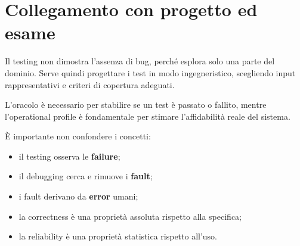 \section{Collegamento con progetto ed esame}

Il testing non dimostra l'assenza di bug, perché esplora solo una parte del dominio. Serve quindi progettare i test in modo ingegneristico, scegliendo input rappresentativi e criteri di copertura adeguati.

L'oracolo è necessario per stabilire se un test è passato o fallito, mentre l'operational profile è fondamentale per stimare l'affidabilità reale del sistema.

È importante non confondere i concetti:

\begin{itemize}
    \item il testing osserva le \textbf{failure};
    \item il debugging cerca e rimuove i \textbf{fault};
    \item i fault derivano da \textbf{error} umani;
    \item la correctness è una proprietà assoluta rispetto alla specifica;
    \item la reliability è una proprietà statistica rispetto all'uso.
\end{itemize}

